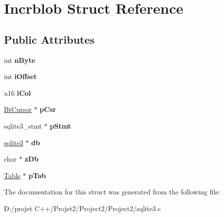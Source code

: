 \hypertarget{struct_incrblob}{}\section{Incrblob Struct Reference}
\label{struct_incrblob}
\subsection*{Public Attributes}
\begin{DoxyCompactItemize}
\item 
\mbox{\label{struct_incrblob_ab1e1439df086208173fa97003f0ee02b}} 
int {\bfseries n\+Byte}
\item 
\mbox{\label{struct_incrblob_af8e71744f43178967460b9f402e7fafd}} 
int {\bfseries i\+Offset}
\item 
\mbox{\label{struct_incrblob_a548b6446ea03ea0ab17c99fd7cef5884}} 
u16 {\bfseries i\+Col}
\item 
\mbox{\label{struct_incrblob_af5a24b18473d1449c8c3fe7d826de59a}} 
\mbox{\hyperlink{struct_bt_cursor}{Bt\+Cursor}} $\ast$ {\bfseries p\+Csr}
\item 
\mbox{\label{struct_incrblob_a8b7b39c9372db552add74c69f14a61a3}} 
sqlite3\+\_\+stmt $\ast$ {\bfseries p\+Stmt}
\item 
\mbox{\label{struct_incrblob_a9d3fe0b0229b75b9d0f9ee8e6545b5bc}} 
\mbox{\hyperlink{structsqlite3}{sqlite3}} $\ast$ {\bfseries db}
\item 
\mbox{\label{struct_incrblob_a908d355a5ea919ea43b0f8377b1d27de}} 
char $\ast$ {\bfseries z\+Db}
\item 
\mbox{\label{struct_incrblob_a8e8527f370fa5798363ab789f5abe549}} 
\mbox{\hyperlink{struct_table}{Table}} $\ast$ {\bfseries p\+Tab}
\end{DoxyCompactItemize}


The documentation for this struct was generated from the following file\+:\begin{DoxyCompactItemize}
\item 
D\+:/projet C++/\+Projet2/\+Project2/\+Project2/sqlite3.\+c\end{DoxyCompactItemize}
